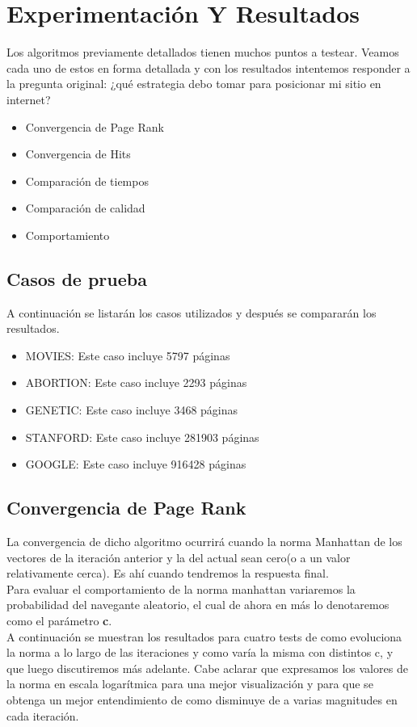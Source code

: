 \section{Experimentación Y Resultados}

  Los algoritmos previamente detallados tienen muchos puntos a testear. Veamos cada uno de estos en forma detallada y con los resultados intentemos responder a la pregunta original: ¿qué estrategia debo tomar para posicionar mi sitio en internet?

  \begin{itemize}
    \item{Convergencia de Page Rank}
    \item{Convergencia de Hits}
    \item{Comparación de tiempos}
    \item{Comparación de calidad}
    \item{Comportamiento}
  \end{itemize}


\subsection{Casos de prueba}
   A continuación se listarán los casos utilizados y después se compararán los resultados.

	\begin{itemize}
		\item MOVIES: Este caso incluye 5797 páginas
		\item ABORTION: Este caso incluye 2293 páginas
		\item GENETIC: Este caso incluye 3468 páginas
		\item STANFORD: Este caso incluye 281903 páginas
		\item GOOGLE: Este caso incluye 916428 páginas
	\end{itemize}  

\subsection{Convergencia de Page Rank} 

La convergencia de dicho algoritmo ocurrirá cuando la norma Manhattan de los vectores de la iteración anterior y la del actual sean cero(o a un valor relativamente cerca). Es ahí cuando tendremos la respuesta final.\\
Para evaluar el comportamiento de la norma manhattan variaremos la probabilidad del navegante aleatorio, el cual de ahora en más lo denotaremos como el parámetro \textbf{c}.\\
A continuación se muestran los resultados para cuatro tests de como evoluciona la norma a lo largo de las iteraciones y como varía la misma con distintos c, y que luego discutiremos más adelante.
Cabe aclarar que expresamos los valores de la norma en escala logarítmica para una mejor visualización y para que se obtenga un mejor entendimiento de como disminuye de a varias magnitudes en cada iteración.


